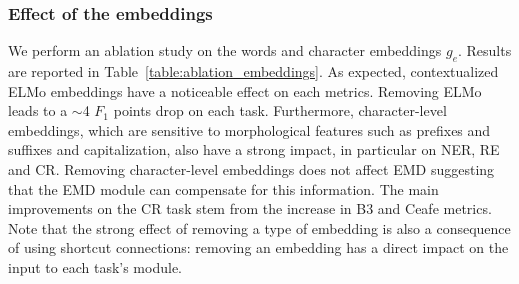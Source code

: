 \documentclass[letterpaper]{article}
\begin{document}
\begin{table}
\centering
\caption{Comparison to other canonical datasets on NER (CoNLL-2003) and coreference (CoNLL-2012). A-CoNLL: train A-RS-GM using CoNLL-2003 for NER; A-CoNLL-2012: train A using CoNLL-2012 for coreference.}
\label{table:canocical}
\end{table}


\subsubsection*{Effect of the embeddings}

We perform an ablation study on the words and character embeddings $g_{e}$. Results are reported in Table~\ref{table:ablation_embeddings}. As expected, contextualized ELMo embeddings have a noticeable effect on each metrics. Removing ELMo leads to a $\sim$4 $F_{1}$ points drop on each task. Furthermore, character-level embeddings, which are sensitive to morphological features such as prefixes and suffixes and capitalization, also have a strong impact, in particular on NER, RE and CR. Removing character-level embeddings does not affect EMD suggesting that the EMD module can compensate for this information. The main improvements on the CR task stem from the increase in B3 and Ceafe metrics. Note that the strong effect of removing a type of embedding is also a consequence of using shortcut connections: removing an embedding has a direct impact on the input to each task's module.
\end{document}
